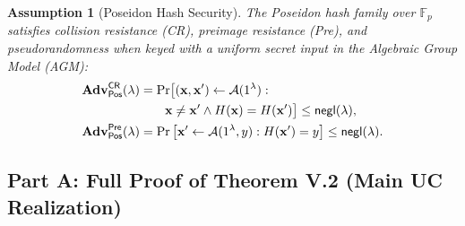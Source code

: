 \documentclass[10pt,letterpaper,journal]{IEEEtran}
\newtheorem{assumption}[theorem]{Assumption}
\begin{document}
\begin{assumption}[Poseidon Hash Security]
\label{asm:poseidon}
The Poseidon hash family over $\mathbb{F}_p$ satisfies collision resistance (CR), preimage resistance (Pre), and pseudorandomness when keyed with a uniform secret input in the Algebraic Group Model (AGM):
\begin{align}
  \mathbf{Adv}^{\mathsf{CR}}_{\mathsf{Pos}}(\lambda) &= \Pr\bigl[(\mathbf{x},\mathbf{x}') \leftarrow \mathcal{A}(1^\lambda) : \notag \\
  &\qquad \mathbf{x} \neq \mathbf{x}' \land H(\mathbf{x}) = H(\mathbf{x}')\bigr] \leq \mathsf{negl}(\lambda), \label{eq:adv-cr-pos} \\
  \mathbf{Adv}^{\mathsf{Pre}}_{\mathsf{Pos}}(\lambda) &= \Pr\left[\mathbf{x}' \leftarrow \mathcal{A}(1^\lambda, y) : H(\mathbf{x}') = y\right] \leq \mathsf{negl}(\lambda). \label{eq:adv-pre-pos}
\end{align}
\end{assumption}

\subsection{Part A: Full Proof of Theorem V.2 (Main UC Realization)}
\label{sec:supp-proof-main-uc}
\end{document}
